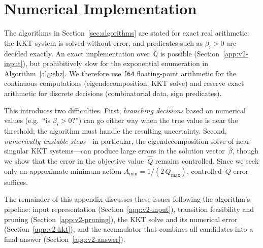 %
%
%

\section{Numerical Implementation}\label{app:numerical-v2}


The algorithms in Section~\ref{sec:algorithms} are stated for exact
real arithmetic: the KKT system is solved without error, and
predicates such as $\beta_i > 0$ are decided exactly.
An exact implementation over~$\mathbb{Q}$ is possible
(Section~\ref{app:v2-input}), but prohibitively slow for the
exponential enumeration in Algorithm~\ref{alg:ehz}.
We therefore use \texttt{f64} floating-point arithmetic for the
continuous computations (eigendecomposition, KKT solve) and reserve exact
arithmetic for discrete decisions (combinatorial data,
sign predicates).

This introduces two difficulties.
First, \emph{branching decisions} based on numerical values
(e.g.\ ``is $\beta_i > 0$?'') can go either way when the true
value is near the threshold; the algorithm must handle
the resulting uncertainty.
Second, \emph{numerically unstable steps}---in particular,
the eigendecomposition solve of near-singular KKT systems---can
produce large errors in the solution vector~$\hat\beta$, though
we show that the error in the objective value~$\hat Q$ remains
controlled.
Since we seek only an approximate minimum action
$A_{\min} = 1/(2\,Q_{\max})$, controlled~$Q$ error suffices.

The remainder of this appendix discusses these issues following
the algorithm's pipeline: input representation
(Section~\ref{app:v2-input}), transition feasibility and pruning
(Section~\ref{app:v2-pruning}), the KKT solve and its numerical
error (Section~\ref{app:v2-kkt}), and the accumulator that
combines all candidates into a final answer
(Section~\ref{app:v2-answer}).


